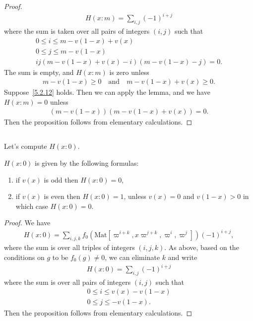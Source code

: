 \begin{proof}
\begin{align}
    H(x:m) = \sum_{i, j}(-1)^{i+j}
\end{align}
where the sum is taken over all pairs of integers $(i, j)$ such that
\begin{gather}
    0 \leq i \leq m - v(1-x) + v(x) \\
    0 \leq j \leq m - v(1-x) \\
    ij(m-v(1-x)+v(x)-i)(m-v(1-x)-j)=0.
\end{gather}
The sum is empty, and $H(x:m)$ is zero unless
\begin{align}
\label{5.2.12}
    m - v(1-x) \geq 0 \quad \text{and} \quad m - v(1-x) + v(x) \geq 0.
\end{align}
Suppose~\eqref{5.2.12} holds.
Then we can apply the lemma, and we have $H(x:m)=0$ unless
\begin{align}
    (m-v(1-x))(m-v(1-x)+v(x)) =0.
\end{align}
Then the proposition follows from elementary calculations.
\end{proof}

\subsection{}
Let's compute $H(x:0)$.
\begin{proposition}\label{prop:5.3}
    $H(x:0)$ is given by the following formulas:
    \begin{enumerate}
        \item if $v(x)$ is odd then $H(x:0) =0$,
        \item if $v(x)$ is even then $H(x:0) =1$, unless $v(x)=0$ and $v(1-x)>0$ in which case $H(x:0)=0$.
    \end{enumerate}
\end{proposition}
\begin{proof}
We have
\begin{align}
    H(x:0) = \sum_{i, j, k} f_{0}(\mathrm{Mat}[\varpi^{i+k}, x\varpi^{j+k}, \varpi^i, \varpi^j]) (-1)^{i+j},
\end{align}
where the sum is over all triples of integers $(i, j, k)$.
As above, based on the conditions on $g$ to be $f_0(g)\neq 0$, we can eliminate $k$ and write
\begin{align}
    H(x:0) = \sum_{i, j} (-1)^{i+j}
\end{align}
where the sum is over all pairs of integers $(i, j)$ such that
\begin{align}
    0 \leq i \leq v(x) - v(1-x) \\
    0 \leq j \leq -v(1-x).
\end{align}
Then the proposition follows from elementary calculations.
\end{proof}

